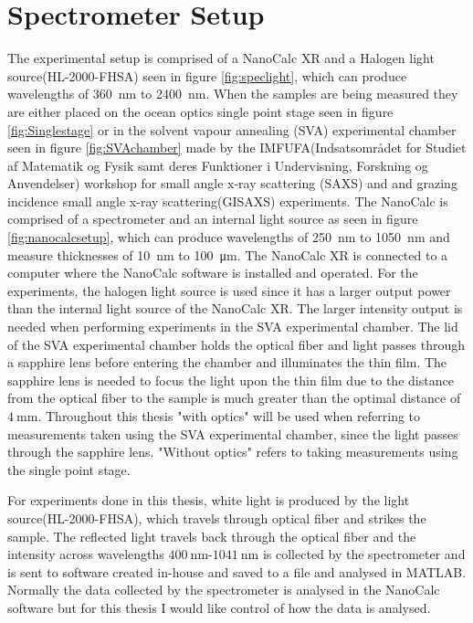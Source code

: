 \documentclass[MasterThesisMain.tex]{subfiles}
\begin{document}
\section{Spectrometer Setup}
The experimental setup is comprised of a NanoCalc XR and a Halogen light source(HL-2000-FHSA) seen in figure \ref{fig:speclight}, which can produce wavelengths of \SI{360}{\nano\meter} to \SI{2400}{\nano\meter}. When the samples are being measured they are either placed on the ocean optics single point stage seen in figure \ref{fig:Singlestage} or in the solvent vapour annealing (SVA) experimental chamber seen in figure \ref{fig:SVAchamber} made by the IMFUFA(Indsatsområdet for Studiet af Matematik og Fysik samt deres Funktioner i Undervisning, Forskning og Anvendelser) workshop for small angle x-ray scattering (SAXS) and and grazing incidence small angle x-ray scattering(GISAXS) experiments. The NanoCalc is comprised of a spectrometer and an internal light source as seen in figure \ref{fig:nanocalcsetup}, which can produce wavelengths of \SI{250}{\nano\meter} to \SI{1050}{\nano\meter} and measure thicknesses of \SI{10}{\nano\meter} to \SI{100}{\micro\meter}. The NanoCalc XR is connected to a computer where the NanoCalc software is installed and operated. For the experiments, the halogen light source is used since it has a larger output power than the internal light source of the NanoCalc XR. The larger intensity output is needed when performing experiments in the SVA experimental chamber. The lid of the SVA experimental chamber holds the optical fiber and light passes through a sapphire lens before entering the chamber and illuminates the thin film. The sapphire lens is needed to focus the light upon the thin film due to the distance from the optical fiber to the sample is much greater than the optimal distance of $\SI{4}{\milli\meter}$. Throughout this thesis "with optics" will be used when referring to measurements taken using the SVA experimental chamber, since the light passes through the sapphire lens. "Without optics" refers to taking measurements using the single point stage.  

For experiments done in this thesis, white light is produced by the light source(HL-2000-FHSA), which travels through optical fiber and strikes the sample. The reflected light travels back through the optical fiber and the intensity across wavelengths $\SI{400}{\nano\meter}$-$\SI{1041}{\nano\meter}$ is collected by the spectrometer and is sent to software created in-house and saved to a file and analysed in MATLAB\textsuperscript{\textregistered}. Normally the data collected by the spectrometer is analysed in the NanoCalc software but for this thesis I would like control of how the data is analysed.  
	
\end{document}

